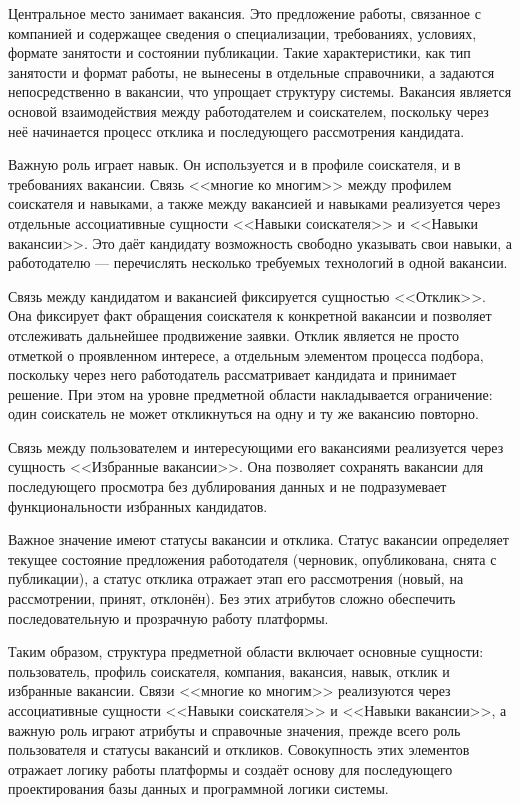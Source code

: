 Центральное место занимает вакансия. Это предложение работы, связанное с компанией и содержащее сведения о специализации, требованиях, условиях, формате занятости и состоянии публикации. Такие характеристики, как тип занятости и формат работы, не вынесены в отдельные справочники, а задаются непосредственно в вакансии, что упрощает структуру системы. Вакансия является основой взаимодействия между работодателем и соискателем, поскольку через неё начинается процесс отклика и последующего рассмотрения кандидата.

Важную роль играет навык. Он используется и в профиле соискателя, и в требованиях вакансии. Связь <<многие ко многим>> между профилем соискателя и навыками, а также между вакансией и навыками реализуется через отдельные ассоциативные сущности <<Навыки соискателя>> и <<Навыки вакансии>>. Это даёт кандидату возможность свободно указывать свои навыки, а работодателю --- перечислять несколько требуемых технологий в одной вакансии.

Связь между кандидатом и вакансией фиксируется сущностью <<Отклик>>. Она фиксирует факт обращения соискателя к конкретной вакансии и позволяет отслеживать дальнейшее продвижение заявки. Отклик является не просто отметкой о проявленном интересе, а отдельным элементом процесса подбора, поскольку через него работодатель рассматривает кандидата и принимает решение. При этом на уровне предметной области накладывается ограничение: один соискатель не может откликнуться на одну и ту же вакансию повторно.

Связь между пользователем и интересующими его вакансиями реализуется через сущность <<Избранные вакансии>>. Она позволяет сохранять вакансии для последующего просмотра без дублирования данных и не подразумевает функциональности избранных кандидатов.

Важное значение имеют статусы вакансии и отклика. Статус вакансии определяет текущее состояние предложения работодателя (черновик, опубликована, снята с публикации), а статус отклика отражает этап его рассмотрения (новый, на рассмотрении, принят, отклонён). Без этих атрибутов сложно обеспечить последовательную и прозрачную работу платформы.

Таким образом, структура предметной области включает основные сущности: пользователь, профиль соискателя, компания, вакансия, навык, отклик и избранные вакансии. Связи <<многие ко многим>> реализуются через ассоциативные сущности <<Навыки соискателя>> и <<Навыки вакансии>>, а важную роль играют атрибуты и справочные значения, прежде всего роль пользователя и статусы вакансий и откликов. Совокупность этих элементов отражает логику работы платформы и создаёт основу для последующего проектирования базы данных и программной логики системы.

